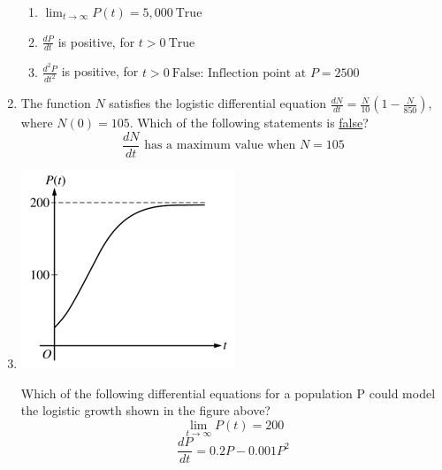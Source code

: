 \documentclass[12pt]{article}
\begin{document}
\begin{enumerate}
    \begin{enumerate}[I]
        \item $\lim_{t\to\infty} P(t) = 5,000 \: \boxed{\text{True}}$ 
        \item $\frac{dP}{dt}$ is positive, for $t>0 \: \boxed{\text{True}}$
        \item $\frac{d^2P}{dt^2}$ is positive, for $t>0 \: \boxed{\text{False: Inflection point at $P=2500$}}$
    \end{enumerate}
    \item The function $N$ satisfies the logistic differential equation $\frac{dN}{dt}=\frac{N}{10}(1-\frac{N}{850})$, where $N(0) = 105$. Which of the following statements is \underline{false}?
    $$\boxed{\frac{dN}{dt} \text{ has a maximum value when }  N=105}$$
    \item 
    \begin{center}
        \includegraphics[scale=0.9]{original-6.png}
    \end{center}
    Which of the following differential equations for a population P could model the logistic growth shown in the figure above?
    $$\lim_{t\to\infty} P(t) = 200$$
    $$\boxed{\frac{dP}{dt}=0.2P-0.001P^2}$$
\end{enumerate}
\end{document}
